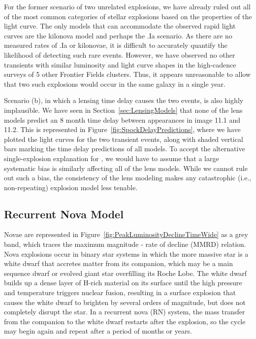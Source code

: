 For the former scenario of two unrelated explosions, we have already
ruled out all of the most common categories of stellar explosions
based on the properties of the light curve.  The only models that can
accommodate the observed rapid light curves are the kilonova model and
perhaps the .Ia scenario.  As there are no measured rates of .Ia or
kilonovae, it is difficult to accurately quantify the likelihood of
detecting such rare events. However, we have observed no other
transients with similar luminosity and light curve shapes in the
high-cadence surveys of 5 other Frontier Fields clusters.  Thus, it
appears unreasonable to allow that two such explosions would occur in
the same galaxy in a single year.

Scenario (b), in which a lensing time delay causes the two events, is
also highly implausible.  We have seen in
Section~\ref{sec:LensingModels} that none of the  lens models
predict an 8 month time delay between appearances in image 11.1 and
11.2.  This is represented in Figure~\ref{fig:SpockDelayPredictions},
where we have plotted the light curves for the two transient events,
along with shaded vertical bars marking the time delay predictions of
all models.
To accept the alternative single-explosion explanation for \spock, we
would have to assume that a large systematic bias is similarly
affecting all of the lens models.  While we cannot rule out such a
bias, the consistency of the lens modeling makes any catastrophic
(i.e., non-repeating) explosion model less tenable.



\subsection{Recurrent Nova Model}

Novae are represented in
Figure~\ref{fig:PeakLuminosityDeclineTimeWide} as a grey band, which
traces the maximum magnitude - rate of decline (MMRD) relation.  Nova
explosions occur in binary star systems in which the more massive star
is a white dwarf that accretes matter from its companion, which may be
a main sequence dwarf or evolved giant star overfilling its Roche
Lobe. The white dwarf builds up a dense layer of H-rich material on
its surface until the high pressure and temperature triggers nuclear
fusion, resulting in a surface explosion that causes the white dwarf
to brighten by several orders of magnitude, but does not completely
disrupt the star. In a recurrent nova (RN) system, the mass transfer
from the companion to the white dwarf restarts after the explosion, so
the cycle may begin again and repeat after a period of months or
years.

